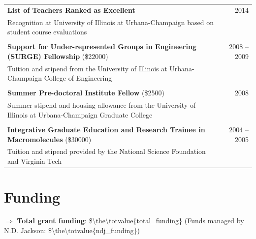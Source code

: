 \documentclass{article}[12pt]
\begin{document}
\begin{tabularx}{\textwidth}{Xr}
			\textbf{List of Teachers Ranked as Excellent} & 2014 \\
			Recognition at University of Illinois at Urbana-Champaign based on student course evaluations \\
			\\
			\textbf{Support for Under-represented Groups in Engineering (SURGE) Fellowship} (\$\num{22000})  & 2008 -- 2009 \\
			Tuition and stipend from the University of Illinois at Urbana-Champaign College of Engineering  \\
			\\
			\textbf{Summer Pre-doctoral Institute Fellow} (\$\num{2500}) & 2008 \\
			Summer stipend and housing allowance from the University of Illinois at Urbana-Champaign Graduate College \\
			\\
			\textbf{Integrative Graduate Education and Research Trainee in Macromolecules} (\$\num{30000}) & 2004 -- 2005 \\
			Tuition and stipend provided by the National Science Foundation and Virginia Tech 
			
		\end{tabularx}
		
		
		
		\vspace{-1.5em}
		\section*{Funding}
		
		
		$\Rightarrow$ \textbf{Total grant funding}: \$\num{\the\totvalue{total_funding}} (Funds managed by N.D. Jackson: \$\num{\the\totvalue{ndj_funding}})	
		
		
		\addtocounter{mcee}{1681000}
		\addtocounter{total_funding}{\value{mcee}}
		
		\addtocounter{redeems}{1200000}
		\addtocounter{total_funding}{\value{redeems}}
		
\end{document}
